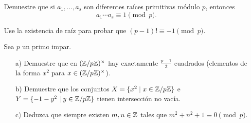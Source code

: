 \documentclass{article}
\begin{document}
\begin{problema}[Gauss]
  Demuestre que si $a_1, \ldots, a_s$ son diferentes raíces primitivas módulo
  $p$, entonces
  $$a_1 \cdots a_s \equiv 1 \pmod{p}.$$
\end{problema}

\begin{problema}
  Use la existencia de raíz para probar que $(p-1)! \equiv -1 \pmod{p}$.
\end{problema}

\begin{problema}
  Sea $p$ un primo impar.

  \begin{enumerate}
  \item[a)] Demuestre que en $(\mathbb{Z}/p\mathbb{Z})^\times$ hay exactamente $\frac{p-1}{2}$
    cuadrados (elementos de la forma $x^2$ para $x \in (\mathbb{Z}/p\mathbb{Z})^\times$).

  \item[b)] Demuestre que los conjuntos $X = \{ x^2 \mid x \in \mathbb{Z}/p\mathbb{Z} \}$ e
    $Y = \{ -1-y^2 \mid y \in \mathbb{Z}/p\mathbb{Z} \}$ tienen intersección no vacía.

  \item[c)] Deduzca que siempre existen $m,n \in \mathbb{Z}$ tales que
    $m^2 + n^2 + 1 \equiv 0 \pmod{p}$.
  \end{enumerate}
\end{problema}
\end{document}

